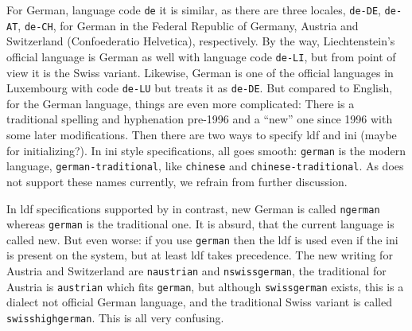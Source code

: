 For German, language code \texttt{de} it is similar, as there are three locales, 
\texttt{de-DE}, \texttt{de-AT}, \texttt{de-CH}, for German in the Federal Republic of Germany, 
Austria and Switzerland (Confoederatio Helvetica), respectively. 
By the way, Liechtenstein's official language is German as well with language code \texttt{de-LI}, 
but from  point of view it is the Swiss variant. 
Likewise, German is one of the official languages in Luxembourg with code \texttt{de-LU} 
but  treats it as \texttt{de-DE}. 
But compared to English, for the German language, 
things are even more complicated: 
There is a traditional spelling and hyphenation pre-1996 and a ``new'' one since 1996 with some later modifications. 
Then there are two ways to specify ldf and ini (maybe for initializing?). 
In ini style specifications, all goes smooth: \texttt{german} is the modern language, \texttt{german-traditional}, 
like \texttt{chinese} and \texttt{chinese-traditional}. 
As  does not support these names currently, 
we refrain from further discussion. 


In ldf specifications supported by  in contrast, 
new German is called \texttt{ngerman} whereas \texttt{german} is the traditional one. 
It is absurd, that the current language is called new. 
But even worse: if you use \texttt{german} then the ldf is used even if the ini is present on the system, 
but at least ldf takes precedence. 
The new writing for Austria and Switzerland are \texttt{naustrian} and \texttt{nswissgerman}, 
the traditional for Austria is \texttt{austrian} which fits \texttt{german}, 
but although \texttt{swissgerman} exists, this is a dialect not official German language, 
and the traditional Swiss variant is called  \texttt{swisshighgerman}. 
This is all very confusing. 



